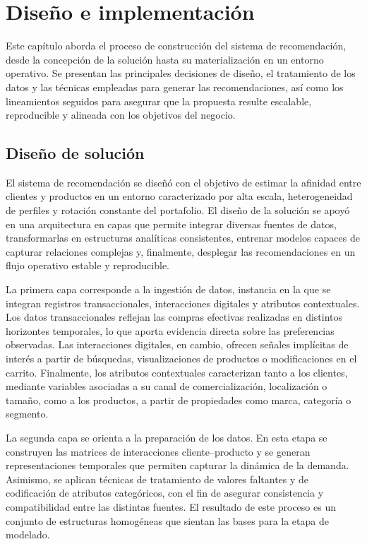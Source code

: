 \chapter{Diseño e implementación} %

\label{Chapter3} %

Este capítulo aborda el proceso de construcción del sistema de recomendación, desde la concepción de la solución hasta su materialización en un entorno operativo. Se presentan las principales decisiones de diseño, el tratamiento de los datos y las técnicas empleadas para generar las recomendaciones, así como los lineamientos seguidos para asegurar que la propuesta resulte escalable, reproducible y alineada con los objetivos del negocio.


\section{Diseño de solución}

El sistema de recomendación se diseñó con el objetivo de estimar la afinidad entre clientes y productos en un entorno caracterizado por alta escala, heterogeneidad de perfiles y rotación constante del portafolio. El diseño de la solución se apoyó en una arquitectura en capas que permite integrar diversas fuentes de datos, transformarlas en estructuras analíticas consistentes, entrenar modelos capaces de capturar relaciones complejas y, finalmente, desplegar las recomendaciones en un flujo operativo estable y reproducible.

La primera capa corresponde a la ingestión de datos, instancia en la que se integran registros transaccionales, interacciones digitales y atributos contextuales. Los datos transaccionales reflejan las compras efectivas realizadas en distintos horizontes temporales, lo que aporta evidencia directa sobre las preferencias observadas. Las interacciones digitales, en cambio, ofrecen señales implícitas de interés a partir de búsquedas, visualizaciones de productos o modificaciones en el carrito. Finalmente, los atributos contextuales caracterizan tanto a los clientes, mediante variables asociadas a su canal de comercialización, localización o tamaño, como a los productos, a partir de propiedades como marca, categoría o segmento.

La segunda capa se orienta a la preparación de los datos. En esta etapa se construyen las matrices de interacciones cliente–producto y se generan representaciones temporales que permiten capturar la dinámica de la demanda. Asimismo, se aplican técnicas de tratamiento de valores faltantes y de codificación de atributos categóricos, con el fin de asegurar consistencia y compatibilidad entre las distintas fuentes. El resultado de este proceso es un conjunto de estructuras homogéneas que sientan las bases para la etapa de modelado.

